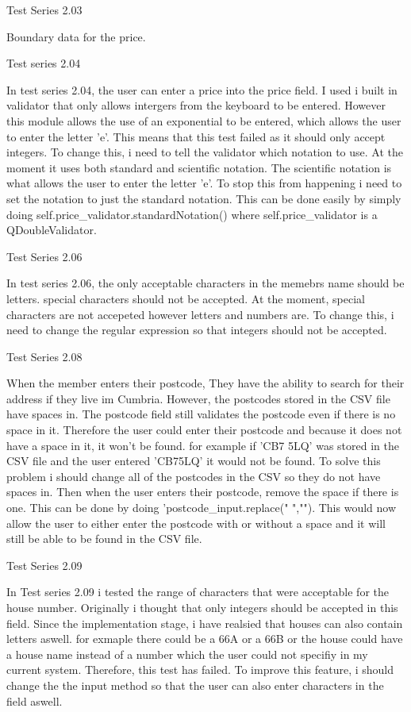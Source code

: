 \begin{flushleft}
Test Series 2.03

Boundary data for the price.


Test series 2.04

In test series 2.04, the user can enter a price into the price field. I used i built in validator that only allows intergers from the keyboard to be entered. However this module allows the use of an exponential to be entered, which allows the user to enter the letter 'e'. This means that this test failed as it should only accept integers. To change this, i need to tell the validator which notation to use. At the moment it uses both standard and scientific notation. The scientific notation is what allows the user to enter the letter 'e'. To stop this from happening i need to set the notation to just the standard notation. This can be done easily by simply doing self.price_validator.standardNotation() where self.price_validator is a QDoubleValidator.

Test Series 2.06

In test series 2.06, the only acceptable characters in the memebrs name should be letters. special characters should not be accepted. At the moment, special characters are not accepeted however letters and numbers are. To change this, i need to change the regular expression so that integers should not be accepted.

Test Series 2.08

When the member enters their postcode, They have the ability to search for their address if they live im Cumbria. However, the postcodes stored in the CSV file have spaces in. The postcode field still validates the postcode even if there is no space in it. Therefore the user could enter their postcode and because it does not have a space in it, it won't be found. for example if 'CB7 5LQ' was stored in the CSV file and the user entered 'CB75LQ' it would not be found. To solve this problem i should change all of the postcodes in the CSV so they do not have spaces in. Then when the user enters their postcode, remove the space if there is one. This can be done by doing 'postcode_input.replace(" ",""). This would now allow the user to either enter the postcode with or without a space and it will still be able to be found in the CSV file.

Test Series 2.09

In Test series 2.09 i tested the range of characters that were acceptable for the house number. Originally i thought that only integers should be accepted in this field. Since the implementation stage, i have realsied that houses can also contain letters aswell. for exmaple there could be a 66A or a 66B or the house could have a house name instead of a number which the user could not specifiy in my current system. Therefore,  this test has failed. To improve this feature, i should change the the input method so that the user can also enter characters in the field aswell.


\end{flushleft}
